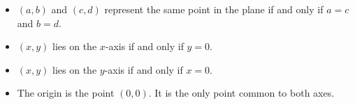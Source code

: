 \documentclass{ximera}
\begin{document}
\begin{itemize}

\item $(a,b)$ and $(c,d)$ represent the same point in the plane if and only if $a = c$ and $b = d$.

\item  $(x,y)$ lies on the $x$-axis if and only if $y = 0$.

\item  $(x,y)$ lies on the $y$-axis if and only if $x=0$.

\item The origin is the point $(0,0)$.  It is the only point common to both axes.


\end{itemize}


\pagebreak
\end{document}
